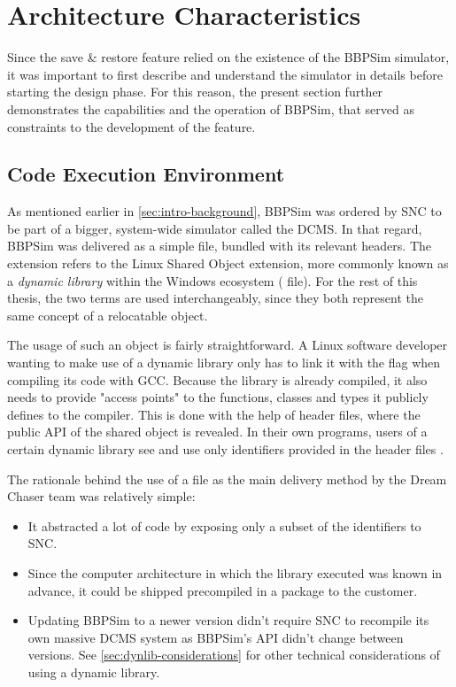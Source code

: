 {\section{Architecture Characteristics}\label{sec:bbpsim-charact}
Since the save \& restore feature relied on the existence of the \gls{BBPSim} simulator, it was important to first describe and understand the simulator in details before starting the design phase. For this reason, the present section further demonstrates the capabilities and the operation of \gls{BBPSim}, that served as constraints to the development of the feature.

\subsection*{Code Execution Environment}
As mentioned earlier in \autoref{sec:intro-background}, \gls{BBPSim} was ordered by \gls{SNC} to be part of a bigger, system-wide simulator called the \gls{DCMS}. In that regard, \gls{BBPSim} was delivered as a simple  file, bundled with its relevant headers. The  extension refers to the Linux Shared Object extension, more commonly known as a \textit{dynamic library} within the Windows ecosystem ( file). For the rest of this thesis, the two terms are used interchangeably, since they both represent the same concept of a relocatable object.

The usage of such an object is fairly straightforward. A Linux software developer wanting to make use of a dynamic library only has to link it with the  flag when compiling its code with GCC. Because the library is already compiled, it also needs to provide "access points" to the functions, classes and types it publicly defines to the compiler. This is done with the help of header files, where the public API of the shared object is revealed. In their own programs, users of a certain dynamic library see and use only identifiers provided in the header files .

The rationale behind the use of a  file as the main delivery method by the Dream Chaser team was relatively simple:
\begin{itemize}
	\item It abstracted a lot of code by exposing only a subset of the identifiers to \gls{SNC}.
	\item Since the computer architecture in which the library executed was known in advance, it could be shipped precompiled in a package to the customer.
	\item Updating \gls{BBPSim} to a newer version didn't require \gls{SNC} to recompile its own massive \gls{DCMS} system as \gls{BBPSim}'s API didn't change between versions. See \autoref{sec:dynlib-considerations} for other  technical considerations of using a dynamic library.
\end{itemize}

}
